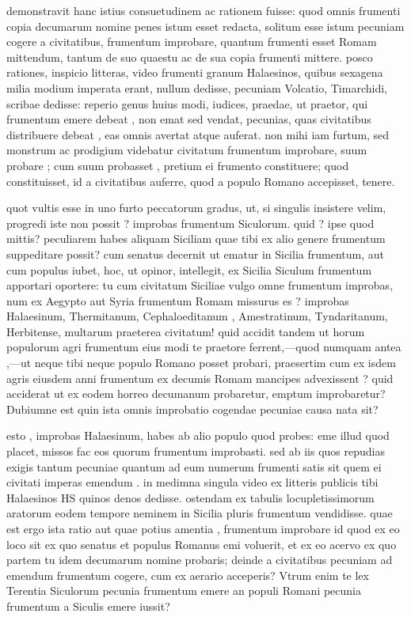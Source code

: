  demonstravit hanc istius consuetudinem ac rationem fuisse: quod omnis frumenti copia decumarum nomine penes istum esset redacta, solitum esse istum pecuniam cogere a civitatibus, frumentum improbare, quantum frumenti esset Romam mittendum, tantum de suo quaestu ac de sua copia frumenti mittere. posco rationes, inspicio litteras, video frumenti granum Halaesinos, quibus sexagena milia modium imperata erant, nullum dedisse, pecuniam Volcatio, Timarchidi, scribae dedisse: reperio genus huius modi, iudices, praedae, ut praetor, qui frumentum emere debeat , non emat sed vendat, pecunias, quas civitatibus distribuere debeat , eas omnis avertat atque auferat. non mihi iam furtum, sed monstrum ac prodigium videbatur civitatum frumentum improbare, suum probare ; cum suum probasset , pretium ei frumento constituere; quod constituisset, id a civitatibus auferre, quod a populo Romano accepisset, tenere.

 quot vultis esse in uno furto peccatorum gradus, ut, si singulis insistere velim, progredi iste non possit ? improbas frumentum Siculorum. quid ? ipse quod mittis? peculiarem habes aliquam Siciliam quae tibi ex alio genere frumentum suppeditare possit? cum senatus decernit ut ematur in Sicilia frumentum, aut cum populus iubet, hoc, ut opinor, intellegit, ex Sicilia Siculum frumentum apportari oportere: tu cum civitatum Siciliae vulgo omne frumentum improbas, num ex Aegypto aut Syria frumentum Romam missurus es ? improbas Halaesinum, Thermitanum, Cephaloeditanum , Amestratinum, Tyndaritanum, Herbitense, multarum praeterea civitatum! quid accidit tandem ut horum populorum agri frumentum eius modi te praetore ferrent,—quod numquam antea ,—ut neque tibi neque populo Romano posset probari, praesertim cum ex isdem agris eiusdem anni frumentum ex decumis Romam mancipes advexissent ? quid acciderat ut ex eodem horreo decumanum probaretur, emptum improbaretur? Dubiumne est quin ista omnis improbatio cogendae pecuniae causa nata sit?

 esto , improbas Halaesinum, habes ab alio populo quod probes: eme illud quod placet, missos fac eos quorum frumentum improbasti. sed ab iis quos repudias exigis tantum pecuniae quantum ad eum numerum frumenti satis sit quem ei civitati imperas emendum . in medimna singula video ex litteris publicis tibi Halaesinos HS quinos denos dedisse. ostendam ex tabulis locupletissimorum aratorum eodem tempore neminem in Sicilia pluris frumentum vendidisse. quae est ergo ista ratio aut quae potius amentia , frumentum improbare id quod ex eo loco sit ex quo senatus et populus Romanus emi voluerit, et ex eo acervo ex quo partem tu idem decumarum nomine probaris; deinde a civitatibus pecuniam ad emendum frumentum cogere, cum ex aerario acceperis? Vtrum enim te lex Terentia Siculorum pecunia frumentum emere an populi Romani pecunia frumentum a Siculis emere iussit?

